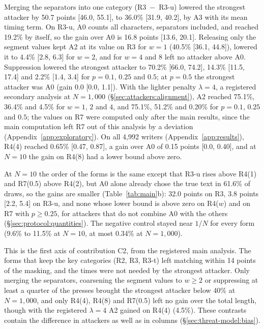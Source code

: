 Merging the separators into one category (R3~$-$~R3-u) lowered the strongest attacker by 50.7 points [46.0, 55.1], to
36.0\% [31.9, 40.2], by A3 with its mean timing term. On R3-u, A0 counts all characters, separators included, and
reached 19.2\% by itself, so the gain over A0 is 16.8 points [13.6, 20.1]. Releasing only the segment values kept A2 at its value on R3 for $w =
1$ (40.5\% [36.1, 44.8]), lowered it to 4.4\% [2.8, 6.3] for $w = 2$, and for $w = 4$ and $8$ left no attacker above
A0. Suppression lowered the strongest
attacker to 70.2\% [66.0, 74.2], 14.3\% [11.5, 17.4] and 2.2\% [1.4, 3.4] for $p = 0.1$, $0.25$ and $0.5$; at $p =
0.5$ the strongest attacker was A0 (gain 0.0 [0.0, 1.1]). With the lighter penalty $\lambda = 4$, a registered
secondary analysis at $N = 1{,}000$ (\S\ref{sec:attackers:alignment}), A2 reached 75.1\%, 36.4\% and 4.5\% for
$w = 1$, $2$ and $4$, and 75.1\%, 51.2\% and 0.20\% for $p = 0.1$, $0.25$ and $0.5$; the values on R7 were computed
only after the main results, since the main computation left R7 out of this analysis by a deviation
(Appendix~\ref{app:exploratory}). On all 4,992 writers (Appendix~\ref{app:results}), R4(4) reached 0.65\% [0.47,
0.87], a gain over A0 of 0.15 points [0.0, 0.40], and at $N = 10$ the gain on R4(8) had a lower bound above zero.

At $N = 10$ the order of the forms is the same except that R3-u rises above R4(1) and R7(0.5) above R4(2), but A0 alone already chose the true text in 61.6\% of draws, so the
gains are smaller (Table~\ref{tab:main}b): 32.0 points on R3, 3.8 points [2.2, 5.4] on R3-u, and none whose lower
bound is above zero on R4($w$) and on R7 with $p \geq 0.25$, for attackers that do not combine A0 with the others
(\S\ref{sec:protocol:quantities}). The negative control stayed near $1/N$ for every form
(9.6\% to 11.5\% at $N = 10$, at most 0.34\% at $N = 1{,}000$).

This is the first axis of contribution C2, from the registered main analysis. The forms that keep the key categories (R2,
R3, R3-t) left matching within 14 points of the masking, and the times were not needed by the strongest attacker. Only
merging the separators, coarsening the segment values to $w \geq 2$ or suppressing at least a quarter of the presses
brought the strongest attacker below 40\% at $N = 1{,}000$, and only R4(4), R4(8) and R7(0.5) left no gain over the
total length, though with the registered $\lambda = 4$ A2 gained on R4(4) (4.5\%). These contrasts contain the difference in attackers as well as in columns
(\S\ref{sec:threat-model:bias}).

